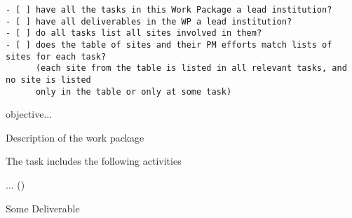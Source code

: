 \begin{draft}
\begin{verbatim}
- [ ] have all the tasks in this Work Package a lead institution?
- [ ] have all deliverables in the WP a lead institution?
- [ ] do all tasks list all sites involved in them?
- [ ] does the table of sites and their PM efforts match lists of sites for each task?
      (each site from the table is listed in all relevant tasks, and no site is listed
      only in the table or only at some task)
\end{verbatim}
\end{draft}

\begin{workpackage}[id=eosc,type=MGT,wphases=0-48!.2,swsites,
  title=Services and EOSC Integration,short=EOSC,
  lead=SR,
  SR=16,
  UPSUD=4,
  XFEL=4,
]
\begin{wpobjectives}
 \begin{compactitem}
   \item objective...
 \end{compactitem}
\end{wpobjectives}

\begin{wpdescription}

Description of the work package
\end{wpdescription}

\begin{tasklist}
\begin{task}[title=Task title,
  id=task-id,lead=PS,PM=1,wphases={0-48!.2},
  partners={Simula,PS,XFEL}]
  The task includes the following activities
  \begin{compactitem}
  \item ...
    ()
  \end{compactitem}
\end{task}
\end{tasklist}


\begin{wpdelivs}
\begin{wpdeliv}[due=1,miles=startup,id=infrastructure,dissem=PU,nature=DEC,lead=SR]
  {Some Deliverable}
\end{wpdeliv}

\end{wpdelivs}
\end{workpackage}

